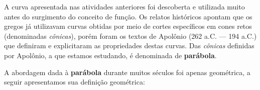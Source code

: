 \label{\detokenize{AF209-6:sec-funcao-quadratica-org-ideias-transformacoes}}\label{\detokenize{AF209-6::doc}}\label{\detokenize{AF209-6:organizando-as-ideias-os-parametros-da-forma-canonica-e-o-grafico-da-funcao-quadratica}}
A curva apresentada nas atividades anteriores foi descoberta e utilizada muito antes do surgimento do conceito de função. Os relatos históricos apontam que os gregos já utilizavam curvas obtidas por meio de cortes específicos em cones retos (denominadas \textit{cônicas}), porém foram os textos de Apolônio (262 a.C. — 194 a.C.) que definiram e explicitaram as propriedades destas curvas. Das \textit{cônicas}
definidas por Apolônio, a que estamos estudando, é denominada de \textbf{parábola}.

A abordagem dada à \textbf{parábola} durante muitos séculos foi apenas geométrica, a seguir apresentamos sua definição geométrica:

